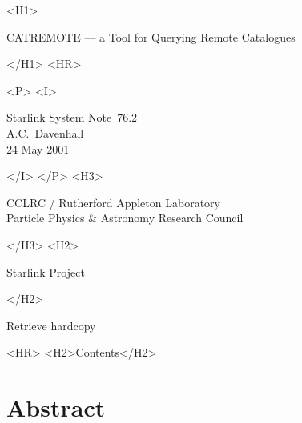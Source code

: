 \documentclass[twoside,11pt]{article}
\newcommand{\stardoccategory}  {Starlink System Note}
\newcommand{\stardocsource}    {ssn\stardocnumber}
\newcommand{\stardocnumber}    {76.2}
\newcommand{\stardocauthors}   {A.C.~Davenhall}
\newcommand{\stardocdate}      {24 May 2001}
\newcommand{\stardoctitle}     {CATREMOTE --- a Tool for Querying Remote
Catalogues}
\newcommand{\htmladdnormallink}[2]{#1}
\newcommand{\htmladdimg}[1]{}
\newcommand{\htmlref}[2]{#1}
\newcommand{\htmladdtonavigation}[1]{}
\newcommand{\xlabel}[1]{}
\renewcommand{\_}{\texttt{\symbol{95}}}
\begin{document}
\begin{htmlonly}
   \xlabel{}
   \begin{rawhtml} <H1> \end{rawhtml}
      \stardoctitle
   \begin{rawhtml} </H1> <HR> \end{rawhtml}

   \begin{rawhtml} <P> <I> \end{rawhtml}
   \stardoccategory\ \stardocnumber \\
   \stardocauthors \\
   \stardocdate
   \begin{rawhtml} </I> </P> <H3> \end{rawhtml}
      \htmladdnormallink{CCLRC / Rutherford Appleton Laboratory}
                        {http://www.cclrc.ac.uk} \\
      \htmladdnormallink{Particle Physics \& Astronomy Research Council}
                        {http://www.pparc.ac.uk} \\
   \begin{rawhtml} </H3> <H2> \end{rawhtml}
      \htmladdnormallink{Starlink Project}{http://www.starlink.ac.uk/}
   \begin{rawhtml} </H2> \end{rawhtml}
   \htmladdnormallink{\htmladdimg{source.gif} Retrieve hardcopy}
      {http://www.starlink.ac.uk/cgi-bin/hcserver?\stardocsource}\\

  \label{stardoccontents}
  \begin{rawhtml}
    <HR>
    <H2>Contents</H2>
  \end{rawhtml}
  \htmladdtonavigation{\htmlref{\htmladdimg{contents_motif.gif}}
        {stardoccontents}}

  \section{\xlabel{abstract}Abstract}

\end{htmlonly}
\end{document}
